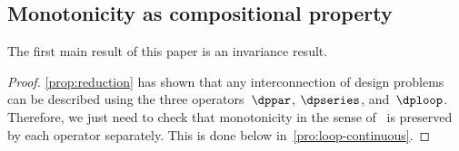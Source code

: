 \subsection{Monotonicity as compositional property\label{sec:Monotone-Co-Design-Problems}}

The first main result of this paper is an invariance result. 

 

\noindent 
{}

\begin{proof}
\cref{prop:reduction} has shown that any interconnection of design
problems can be described using the three operators~$\dppar$, $\dpseries$,
and~$\dploop$. Therefore, we just need to check that monotonicity
in the sense of~ is preserved by each operator
separately. This is done below in~\textendash \ref{pro:loop-continuous}. 
\end{proof}

